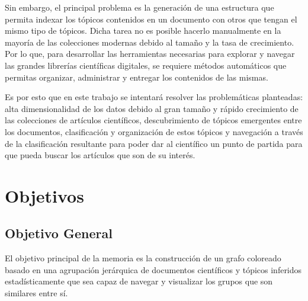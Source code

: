 \documentclass[12pt,oneside,letterpaper]{book}
\theoremstyle{definition}
\begin{document}
Sin embargo, el principal problema es la generación de una estructura que permita indexar los tópicos contenidos en un documento con otros que tengan el mismo tipo de tópicos. Dicha tarea no es posible hacerlo manualmente en la mayoría de las colecciones modernas debido al tamaño y la tasa de crecimiento. Por lo que, para desarrollar las herramientas necesarias para explorar y navegar las grandes librerías científicas digitales, se requiere métodos automáticos que permitas organizar, administrar y entregar los contenidos de las mismas.

Es por esto que en este trabajo se intentará resolver las problemáticas planteadas: alta dimensionalidad de los datos debido al gran tamaño y rápido crecimiento de las colecciones de artículos científicos, descubrimiento de tópicos emergentes entre los documentos, clasificación y organización de estos tópicos y navegación a través de la clasificación resultante para poder dar al científico un punto de partida para que pueda buscar los artículos que son de su interés.


\chapter{Objetivos}
\section{Objetivo General}
\label{sec:objetivo_general}
El objetivo principal de la memoria es la construcción de un grafo coloreado
basado en una agrupación jerárquica de documentos científicos y tópicos inferidos
estadísticamente que sea capaz de navegar y visualizar los grupos que son similares 
entre sí.
\end{document}
